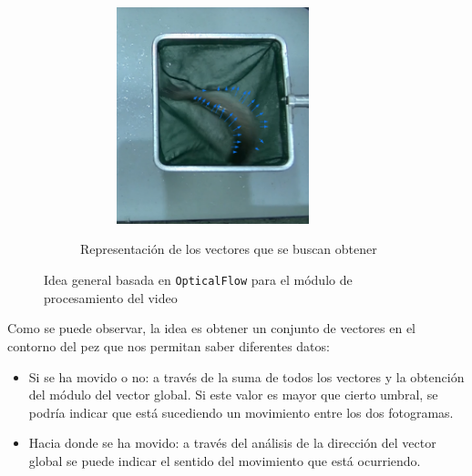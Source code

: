 \begin{enumerate}
\begin{figure}[H]
\begin{subfigure}[b]{\textwidth}
\begin{subfigure}[b]{0.25\textwidth}
                    \label{fig:Opt3}
                \end{subfigure}
                \begin{subfigure}[b]{0.25\textwidth}
                    \centering
                    \includegraphics[width=0.8\textwidth]{images/6/ConOptical4.png}
                    \label{fig:Opt4}
                \end{subfigure}
                \caption{Representación de los vectores que se buscan obtener}
                \label{fig:FotogramasSalidaOF}
            \end{subfigure}
    \caption{Idea general basada en \texttt{OpticalFlow} para el módulo de procesamiento del video}
    \label{fig:IdeaOF}
    \end{figure}

    Como se puede observar, la idea es obtener un conjunto de vectores en el contorno del pez que nos permitan 
    saber diferentes datos:
    \begin{itemize}
        \item Si se ha movido o no: a través de la suma de todos los vectores y la obtención del 
        módulo del vector global. Si este valor es mayor que cierto umbral, se podría indicar que está sucediendo 
        un movimiento entre los dos fotogramas.
        \item Hacia donde se ha movido: a través del análisis de la dirección del vector global se puede indicar 
        el sentido del movimiento que está ocurriendo.
    \end{itemize}


\end{enumerate}
